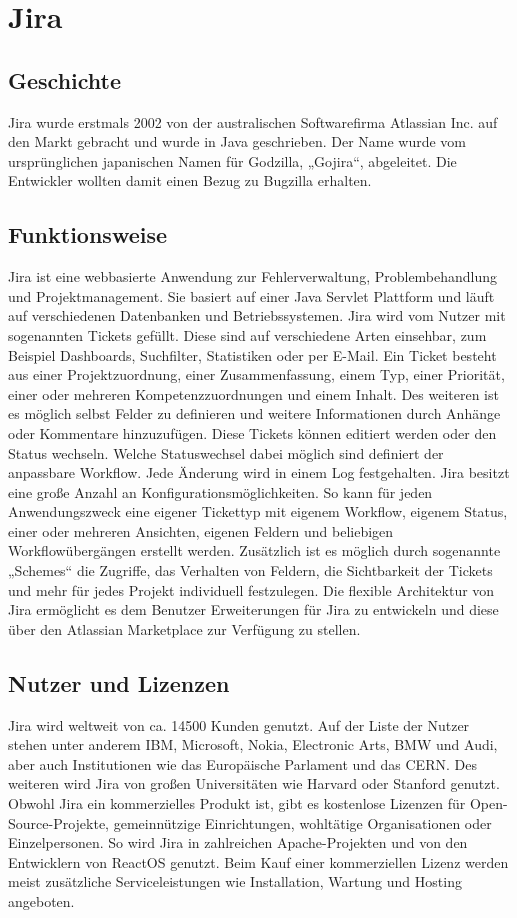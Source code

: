 \section{Jira}
\subsection{Geschichte}
Jira wurde erstmals 2002 von der australischen Softwarefirma Atlassian Inc. auf den Markt gebracht und wurde in Java geschrieben. Der Name wurde vom ursprünglichen japanischen Namen für Godzilla, „Gojira“, abgeleitet. Die Entwickler wollten damit einen Bezug zu Bugzilla erhalten.
\subsection{Funktionsweise}
Jira ist eine webbasierte Anwendung zur Fehlerverwaltung, Problembehandlung und Projektmanagement. Sie basiert auf einer Java Servlet Plattform und läuft auf verschiedenen Datenbanken und Betriebssystemen. Jira wird vom Nutzer mit sogenannten Tickets gefüllt. Diese sind auf verschiedene Arten einsehbar, zum Beispiel Dashboards, Suchfilter, Statistiken oder per E-Mail. Ein Ticket besteht aus einer Projektzuordnung, einer Zusammenfassung, einem Typ, einer Priorität, einer oder mehreren Kompetenzzuordnungen und einem Inhalt. Des weiteren ist es möglich selbst Felder zu definieren und weitere Informationen durch Anhänge oder Kommentare hinzuzufügen. Diese Tickets können editiert werden oder den Status wechseln. Welche Statuswechsel dabei möglich sind definiert der anpassbare Workflow. Jede Änderung wird in einem Log festgehalten. Jira besitzt eine große Anzahl an Konfigurationsmöglichkeiten. So kann für jeden Anwendungszweck eine eigener Tickettyp mit eigenem Workflow, eigenem Status, einer oder mehreren Ansichten, eigenen Feldern und beliebigen Workflowübergängen erstellt werden. Zusätzlich ist es möglich durch sogenannte „Schemes“ die Zugriffe, das Verhalten von Feldern, die Sichtbarkeit der Tickets und mehr für jedes Projekt individuell festzulegen. Die flexible Architektur von Jira ermöglicht es dem Benutzer Erweiterungen für Jira zu entwickeln und diese über den Atlassian Marketplace zur Verfügung zu stellen.
\subsection{Nutzer und Lizenzen}
Jira wird weltweit  von ca. 14500 Kunden genutzt. Auf der Liste der Nutzer stehen unter anderem IBM, Microsoft, Nokia, Electronic Arts, BMW und Audi, aber auch Institutionen wie das Europäische Parlament und das CERN. Des weiteren wird Jira von großen Universitäten wie Harvard oder Stanford genutzt. Obwohl Jira ein kommerzielles Produkt ist, gibt es kostenlose Lizenzen für Open-Source-Projekte, gemeinnützige Einrichtungen, wohltätige Organisationen oder Einzelpersonen. So wird Jira in zahlreichen Apache-Projekten und von den Entwicklern von ReactOS genutzt. Beim Kauf einer kommerziellen Lizenz werden meist zusätzliche Serviceleistungen wie Installation, Wartung und Hosting angeboten.
